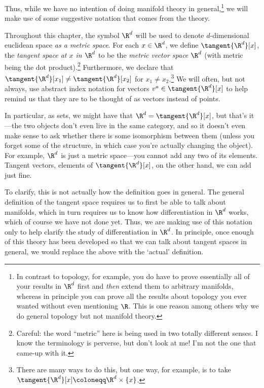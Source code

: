 Thus, while we have no intention of doing manifold theory in general,\footnote{In contrast to topology, for example, you do have to prove essentially all of your results in $\R ^d$ first and \emph{then} extend them to arbitrary manifolds, whereas in principle you can prove all the results about topology you ever wanted without even mentioning $\R$.  This is one reason among others why we do general topology but not manifold theory.} we will make use of some suggestive notation that comes from the theory.
\begin{displayquote}
Throughout this chapter, the symbol $\R ^d$ will be used to denote $d$-dimensional euclidean space \emph{as a metric space}.  For each $x\in \R ^d$, we define $\tangent{\R ^d}[x]$, the \emph{tangent space at $x$ in $\R ^d$} to be the \emph{metric vector space} $\R ^d$ (with metric being the dot product).\footnote{Careful:  the word ``metric'' here is being used in two totally different senses.  I know the terminology is perverse, but don't look at me!  I'm not the one that came-up with it.}  Furthermore, we declare that $\tangent{\R ^d}[x_1]\neq \tangent{\R ^d}[x_2]$ for $x_1\neq x_2$.\footnote{There are many ways to do this, but one way, for example, is to take $\tangent{\R ^d}[x]\coloneqq \R ^d\times \{ x\}$.}  We will often, but not always, use abstract index notation for vectors $v^a\in \tangent{\R ^d}[x]$ to help remind us that they are to be thought of as vectors instead of points.
\end{displayquote}
In particular, as sets, we might have that $\R ^d=\tangent{\R ^d}[x]$, but that's it---the two objects don't even live in the same category, and so it doesn't even make sense to ask whether there is some isomorphism between them (unless you forget some of the structure, in which case you're actually changing the object).  For example, $\R ^d$ is just a metric space---you cannot add any two of its elements.  Tangent vectors, elements of $\tangent{\R ^d}[x]$, on the other hand, we can add just fine.

To clarify, this is not actually how the definition goes in general.  The general definition of the tangent space requires us to first be able to talk about manifolds, which in turn requires us to know how differentiation in $\R ^d$ works, which of course we have not done yet.  Thus, we are making use of this notation only to help clarify the study of differentiation in $\R ^d$.  In principle, once enough of this theory has been developed so that we can talk about tangent spaces in general, we would replace the above with the `actual' definition.

